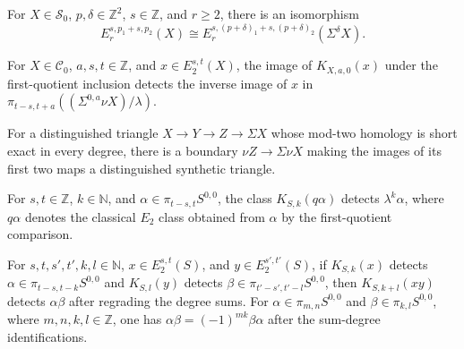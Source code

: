 \begin{definition}
\label{frontier:AdamsSynthetic:f3257e955b3d}
For $X\in\mathcal S_0$, $p,\delta\in\mathbb Z^2$, $s\in\mathbb Z$, and $r\geq2$, there is an isomorphism
\[
E_r^{s,p_1+s,p_2}(X)\cong E_r^{s,(p+\delta)_1+s,(p+\delta)_2}(\Sigma^\delta X).
\]
\end{definition}















\begin{theorem}
\label{frontier:AdamsSynthetic:791f3c0e6a4a}
For $X\in\mathcal C_0$, $a,s,t\in\mathbb Z$, and $x\in E_2^{s,t}(X)$, the image of $K_{X,a,0}(x)$ under the first-quotient inclusion detects the inverse image of $x$ in $\pi_{t-s,t+a}((\Sigma^{0,a}\nu X)/\lambda)$.

For a distinguished triangle $X\to Y\to Z\to\Sigma X$ whose mod-two homology is short exact in every degree, there is a boundary $\nu Z\to\Sigma\nu X$ making the images of its first two maps a distinguished synthetic triangle.

For $s,t\in\mathbb Z$, $k\in\mathbb N$, and $\alpha\in\pi_{t-s,t}S^{0,0}$, the class $K_{S,k}(q\alpha)$ detects $\lambda^k\alpha$, where $q\alpha$ denotes the classical $E_2$ class obtained from $\alpha$ by the first-quotient comparison.

For $s,t,s',t',k,l\in\mathbb N$, $x\in E_2^{s,t}(S)$, and $y\in E_2^{s',t'}(S)$, if $K_{S,k}(x)$ detects $\alpha\in\pi_{t-s,t-k}S^{0,0}$ and $K_{S,l}(y)$ detects $\beta\in\pi_{t'-s',t'-l}S^{0,0}$, then $K_{S,k+l}(xy)$ detects $\alpha\beta$ after regrading the degree sums. For $\alpha\in\pi_{m,n}S^{0,0}$ and $\beta\in\pi_{k,l}S^{0,0}$, where $m,n,k,l\in\mathbb Z$, one has $\alpha\beta=(-1)^{mk}\beta\alpha$ after the sum-degree identifications.
\end{theorem}



